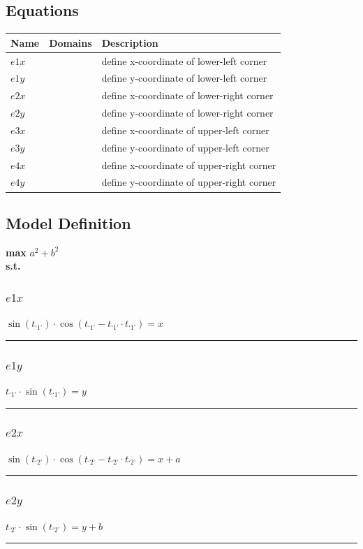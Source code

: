 \documentclass[11pt]{article}
\begin{document}
\subsection*{Equations}
\begin{tabularx}{\textwidth}{| l | l | X |}
\hline
\textbf{Name} & \textbf{Domains} & \textbf{Description}\\
\hline
\endhead

$e1x$ &  & define x-coordinate of lower-left corner\\
$e1y$ &  & define y-coordinate of lower-left corner\\
$e2x$ &  & define x-coordinate of lower-right corner\\
$e2y$ &  & define y-coordinate of lower-right corner\\
$e3x$ &  & define x-coordinate of upper-left corner\\
$e3y$ &  & define y-coordinate of upper-left corner\\
$e4x$ &  & define x-coordinate of upper-right corner\\
$e4y$ &  & define y-coordinate of upper-right corner\\
\hline
\end{tabularx}
\subsection*{Model Definition}
\textbf{max} $a^{2} + b^{2}$\\
\textbf{s.t.}
\subsubsection*{$e1x$}
$
\sin(t_{\text{`1'}}) \cdot \cos(t_{\text{`1'}} - t_{\text{`1'}} \cdot t_{\text{`1'}}) = x
$
\vspace{5pt}
\hrule
\subsubsection*{$e1y$}
$
t_{\text{`1'}} \cdot \sin(t_{\text{`1'}}) = y
$
\vspace{5pt}
\hrule
\subsubsection*{$e2x$}
$
\sin(t_{\text{`2'}}) \cdot \cos(t_{\text{`2'}} - t_{\text{`2'}} \cdot t_{\text{`2'}}) = x + a
$
\vspace{5pt}
\hrule
\subsubsection*{$e2y$}
$
t_{\text{`2'}} \cdot \sin(t_{\text{`2'}}) = y + b
$
\vspace{5pt}
\hrule
\end{document}
